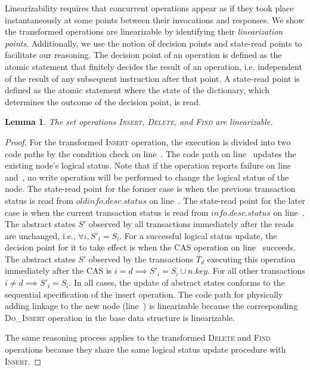 \documentclass{sig-alternate-05-2015}
\newtheorem{lemma}{Lemma}
\begin{document}
Linearizability requires that concurrent operations appear as if they took place instantaneously at some points between their invocations and responses.
We show the transformed operations are linearizable by identifying their \emph{linearization points}.
Additionally, we use the notion of decision points and state-read points to facilitate our reasoning. 
The decision point of an operation is defined as the atomic statement that finitely decides the result of an operation, i.e. independent of the result of any subsequent instruction after that point.
A state-read point is defined as the atomic statement where the state of the dictionary, which determines the outcome of the decision point, is read.

\begin{lemma}
    \label{lemma:linearizable}
    The set operations \textsc{Insert}, \textsc{Delete}, and \textsc{Find} are linearizable.
\end{lemma}
\begin{proof}
    For the transformed \textsc{Insert} operation, the execution is divided into two code paths by the condition check on line~.
    The code path on line~ updates the existing node's logical status.
    Note that if the operation reports failure on line~ and~, no write operation will be performed to change the logical status of the node.
    The state-read point for the former case is when the previous transaction status is read from $oldinfo.desc.status$ on line~.
    The state-read point for the later case is when the current transaction status is read from $info.desc.status$ on line~.
    The abstract states $S'$ observed by all transactions immediately after the reads are unchanged, i.e., $\forall i, S'_i = S_i $.
    For a successful logical status update, the decision point for it to take effect is when the CAS operation on line~ succeeds.
    The abstract states $S'$ observed by the transactions $T_d$ executing this operation immediately after the CAS is $i=d \implies S'_i = S_i \cup n.key$.
    For all other transactions $i \ne d \implies S'_i = S_i$.
    In all cases, the update of abstract states conforms to the sequential specification of the insert operation.
    The code path for physically adding linkage to the new node (line~) is linearizable because the corresponding \textsc{Do\_Insert} operation in the base data structure is linearizable.
    
    The same reasoning process applies to the transformed \textsc{Delete} and \textsc{Find} operations because they share the same logical status update procedure with \textsc{Insert}.
\end{proof}
\end{document}

